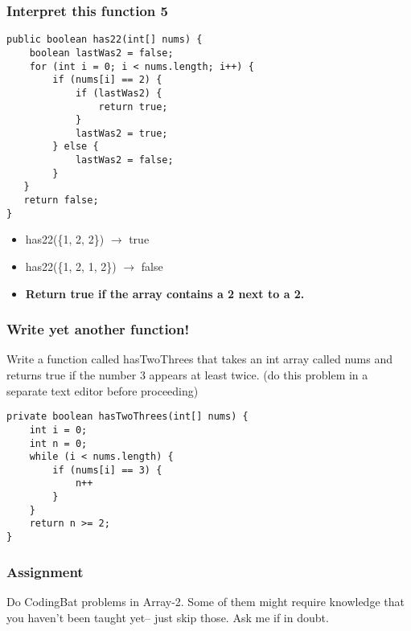 \documentclass{beamer}
\begin{document}
\begin{frame}[fragile]
\frametitle{Interpret this function 5}

\begin{lstlisting}[style=basenopause]
public boolean has22(int[] nums) {
    boolean lastWas2 = false;
    for (int i = 0; i < nums.length; i++) {
        if (nums[i] == 2) {
            if (lastWas2) {
                return true;
            }
            lastWas2 = true;
        } else {
            lastWas2 = false;
        }
   }
   return false;
}
\end{lstlisting}
\begin{itemize}
\item<2-> {has22(\{1, 2, 2\}) $\rightarrow$ true}
\item<3-> {has22(\{1, 2, 1, 2\}) $\rightarrow$ false}
\item<4-> \textbf{Return true if the array contains a 2 next to a 2.}
\end{itemize}
\end{frame}

\begin{frame}[fragile]
\frametitle{Write yet another function!}
Write a function called hasTwoThrees that takes an int array called nums and returns true if the number 3 appears at least twice.
\pause
(do this problem in a separate text editor before proceeding)
\pause
\begin{lstlisting}
private boolean hasTwoThrees(int[] nums) {
    int i = 0;
    int n = 0;
    while (i < nums.length) {
        if (nums[i] == 3) {
            n++
        }
    }
    return n >= 2;
}
\end{lstlisting}
\end{frame}

\begin{frame}
\frametitle{Assignment}
Do CodingBat problems in Array-2. Some of them might require knowledge that you haven't been taught yet-- just skip those. Ask me if in doubt.
\end{frame}
\end{document}
